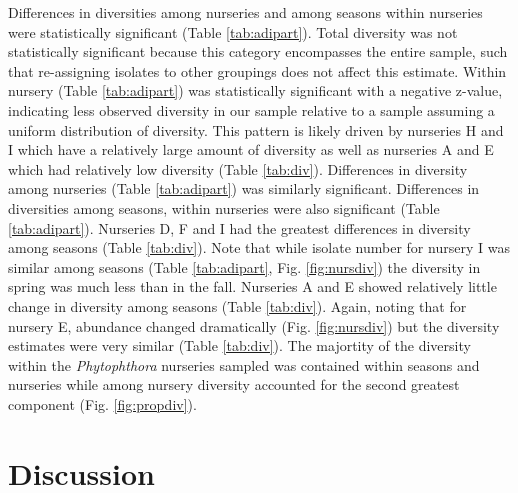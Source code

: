 \documentclass[12pt]{article}
\begin{document}
Differences in diversities among nurseries and among seasons within nurseries were statistically significant (Table \ref{tab:adipart}).  Total diversity was not statistically significant because this category encompasses the entire sample, such that re-assigning isolates to other groupings does not affect this estimate.  Within nursery (Table \ref{tab:adipart}) was statistically significant with a negative z-value, indicating less observed diversity in our sample relative to a sample assuming a uniform distribution of diversity.  This pattern is likely driven by nurseries H and I which have a relatively large amount of diversity as well as nurseries A and E which had relatively low diversity (Table \ref{tab:div}).  Differences in diversity among nurseries (Table \ref{tab:adipart}) was similarly significant.  Differences in diversities among seasons, within nurseries were also significant (Table \ref{tab:adipart}).  Nurseries D, F and I had the greatest differences in diversity among seasons (Table \ref{tab:div}).  Note that while isolate number for nursery I was similar among seasons (Table \ref{tab:adipart}, Fig. \ref{fig:nursdiv}) the diversity in spring was much less than in the fall.  Nurseries A and E showed relatively little change in diversity among seasons (Table \ref{tab:div}).  Again, noting that for nursery E, abundance changed dramatically (Fig. \ref{fig:nursdiv}) but the diversity estimates were very similar (Table \ref{tab:div}).  The majortity of the diversity within the \emph{Phytophthora} nurseries sampled was contained within seasons and nurseries while among nursery diversity accounted for the second greatest component (Fig. \ref{fig:propdiv}).




\section*{\sffamily\normalsize{Discussion}}

\end{document}
